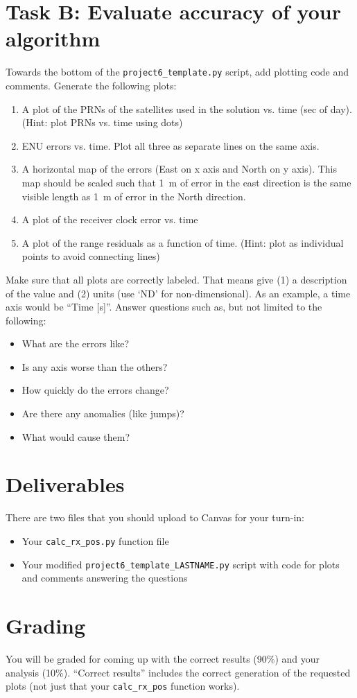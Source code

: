 \documentclass[12pt]{article}
\begin{document}
\section*{\textsf{Task B: Evaluate accuracy of your algorithm}}

Towards the bottom of the \lstinline{project6_template.py} script, add plotting code and
comments.  Generate the following plots:
\begin{enumerate}
   \item A plot of the PRNs of the satellites used in the solution vs. time (sec of day).
      (Hint: plot PRNs vs. time using dots)
   \item ENU errors vs. time.  Plot all three as separate lines on the same
      axis.
   \item A horizontal map of the errors (East on x axis and North on y axis).
      This map should be scaled such that 1~m of error in the east direction is
      the same visible length as 1~m of error in the North direction.
   \item A plot of the receiver clock error vs. time
   \item A plot of the range residuals as a function of time.  (Hint: plot as
      individual points to avoid connecting lines)
\end{enumerate}

Make sure that all plots are correctly labeled.  That means give (1) a description of the
value and (2) units (use `ND' for non-dimensional).  As an example, a time axis
would be ``Time [s]''.  Answer questions such as, but not limited to the following:
\begin{itemize}
   \item What are the errors like?
   \item Is any axis worse than the others?
   \item How quickly do the errors change?
   \item Are there any anomalies (like jumps)?
   \item What would cause them?
\end{itemize}

\section*{\textsf{Deliverables}}

There are two files that you should upload to Canvas for your turn-in:
\begin{itemize}
   \item Your \lstinline{calc_rx_pos.py} function file
   \item Your modified \lstinline{project6_template_LASTNAME.py} script with code for plots and
      comments answering the questions
\end{itemize}

\section*{\textsf{Grading}}

You will be graded for coming up with the correct results (90\%) and your
analysis (10\%).  ``Correct results'' includes the correct generation of the
requested plots (not just that your \lstinline{calc_rx_pos} function works).
\end{document}
